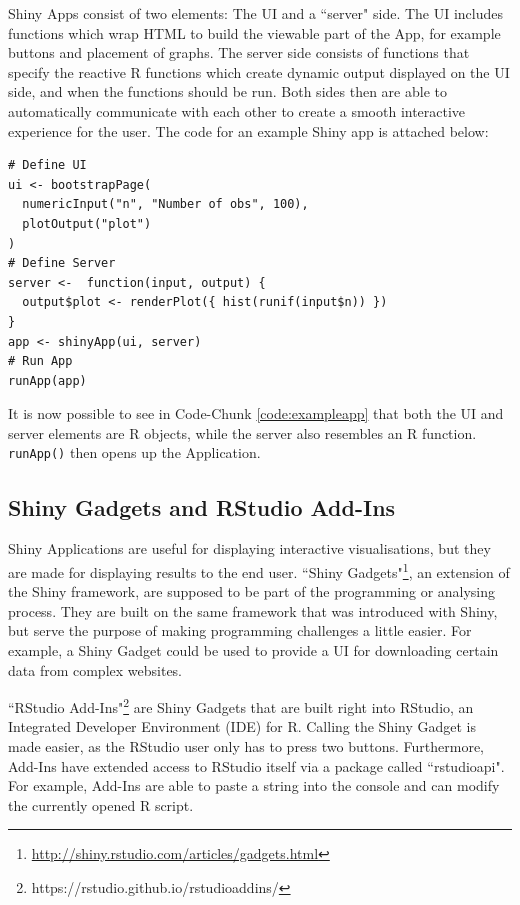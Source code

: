 \documentclass[12pt]{article} %
\newcommand{\li}{\lstinline}
\begin{document}
Shiny Apps consist of two elements: The UI and a ``server" side. The UI includes functions which wrap HTML to build the viewable part of the App, for example buttons and placement of graphs. The server side consists of functions that specify the reactive R functions which create dynamic output displayed on the UI side, and when the functions should be run. Both sides then are able to automatically communicate with each other to create a smooth interactive experience for the user. The code for an example Shiny app is attached below:

\begin{lstlisting}[caption = Example code for a Shiny Application\cite{w2}., label = code:exampleapp]
# Define UI
ui <- bootstrapPage(
  numericInput("n", "Number of obs", 100),
  plotOutput("plot")
)
# Define Server
server <-  function(input, output) {
  output$plot <- renderPlot({ hist(runif(input$n)) })
}
app <- shinyApp(ui, server)
# Run App
runApp(app)
\end{lstlisting}

It is now possible to see in Code-Chunk \ref{code:exampleapp} that both the UI and server elements are R objects, while the server also resembles an R function. \li{runApp()} then opens up the Application.

\subsection{Shiny Gadgets and RStudio Add-Ins}
\label{shinyrstudiochapter}

Shiny Applications are useful for displaying interactive visualisations, but they are made for displaying results to the end user. ``Shiny Gadgets"\footnote{\url{http://shiny.rstudio.com/articles/gadgets.html}}, an extension of the Shiny framework, are supposed to be part of the programming or analysing process. They are built on the same framework that was introduced with Shiny, but serve the purpose of making programming challenges a little easier. For example, a Shiny Gadget could be used to provide a UI for downloading certain data from complex websites. 

``RStudio Add-Ins"\footnote{https://rstudio.github.io/rstudioaddins/} are Shiny Gadgets that are built right into RStudio, an Integrated Developer Environment (IDE) for R. Calling the Shiny Gadget is made easier, as the RStudio user only has to press two buttons. Furthermore, Add-Ins have extended access to RStudio itself via a package called ``rstudioapi". For example, Add-Ins are able to paste a string into the console and can modify the currently opened R script.
\end{document}
